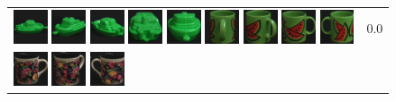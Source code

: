 {\begin{figure}[p]
\begin{tabular}{m{11cm} | m{3cm} |}
\includegraphics[width=1cm]{coil/beeld-55.eps}
\includegraphics[width=1cm]{coil/beeld-57.eps}
\includegraphics[width=1cm]{coil/beeld-58.eps}
\includegraphics[width=1cm]{coil/beeld-59.eps}
\includegraphics[width=1cm]{coil/beeld-56.eps}
\includegraphics[width=1cm]{coil/beeld-35.eps}
\includegraphics[width=1cm]{coil/beeld-34.eps}
\includegraphics[width=1cm]{coil/beeld-30.eps}
\includegraphics[width=1cm]{coil/beeld-31.eps}
& {\scriptsize 0.0}
\\
\includegraphics[width=1cm]{coil/beeld-60.eps}
\includegraphics[width=1cm]{coil/beeld-63.eps}
\includegraphics[width=1cm]{coil/beeld-61.eps}

\end{tabular}
\end{figure}}
